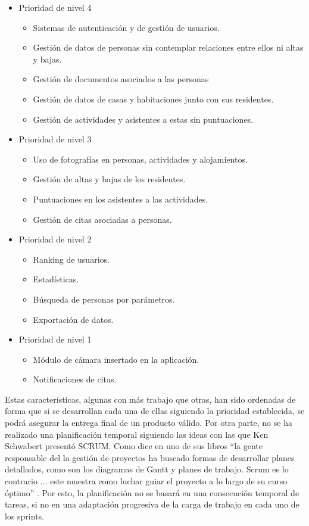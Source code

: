\begin{itemize}
    \item Prioridad de nivel 4
    \begin{itemize}
        \item Sistemas de autenticación y de gestión de usuarios.
        \item Gestión de datos de personas sin contemplar relaciones entre ellos ni altas y bajas.
        \item Gestión de documentos asociados a las personas
        \item Gestión de datos de casas y habitaciones junto con sus residentes.
        \item Gestión de actividades y asistentes a estas sin puntuaciones.
    \end{itemize}
    \item Prioridad de nivel 3
    \begin{itemize}
        \item Uso de fotografías en personas, actividades y alojamientos.
        \item Gestión de altas y bajas de los residentes.
        \item Puntuaciones en los asistentes a las actividades.
        \item Gestión de citas asociadas a personas.
    \end{itemize}
    \item Prioridad de nivel 2
    \begin{itemize}
        \item Ranking de usuarios.
        \item Estadísticas.
        \item Búsqueda de personas por parámetros.
        \item Exportación de datos.
    \end{itemize}
    \item Prioridad de nivel 1
    \begin{itemize}
        \item Módulo de cámara insertado en la aplicación.
        \item Notificaciones de citas. 
    \end{itemize}
\end{itemize}

Estas características, algunas con más trabajo que otras, han sido ordenadas de forma que si se desarrollan cada una de ellas siguiendo la prioridad establecida, se podrá asegurar la entrega final de un producto válido. Por otra parte, no se ha realizado una planificación temporal siguiendo las ideas con las que Ken Schwabert presentó SCRUM. Como dice en uno de sus libros ``la gente responsable del la gestión de proyectos ha buscado formas de desarrollar planes detallados, como son los diagramas de Gantt y planes de trabajo. Scrum es lo contrario {...} este muestra como luchar guiar el proyecto a lo largo de su curso óptimo'' \cite[p.~xvii]{schwaber2004agile}. Por esto, la planificación no se basará en una consecución temporal de tareas, si no en una adaptación progresiva de la carga de trabajo en cada uno de los sprints.

